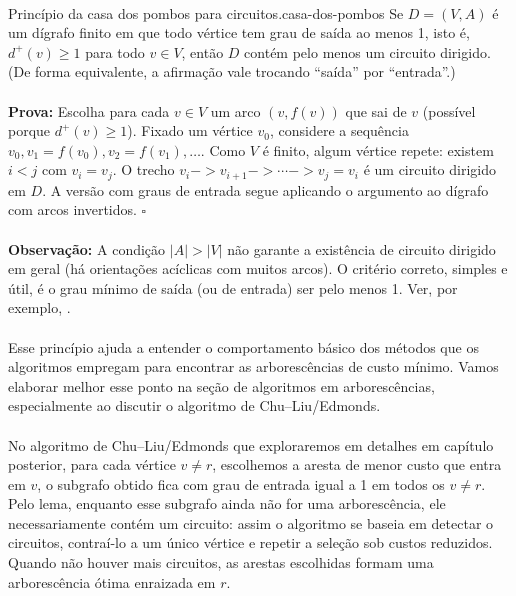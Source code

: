 \documentclass[12pt,a4paper]{article}
\def\emph#1{#1}%
\def\to{->}%
\begin{document}
\paragraph{}
\begin{lemabox}{Princípio da casa dos pombos para circuitos.}{casa-dos-pombos}
    Se \(D=(V,A)\) é um dígrafo finito em que todo vértice tem grau de saída ao menos 1, isto é, \(d^+(v)\ge 1\) para todo \(v\in V\), então \(D\) contém pelo menos um circuito dirigido. (De forma equivalente, a afirmação vale trocando ``saída'' por ``entrada''.)

    \paragraph{}
    \textbf{Prova:} Escolha para cada \(v\in V\) um arco \((v,f(v))\) que sai de \(v\) (possível porque \(d^+(v)\ge 1\)). Fixa\-do um vértice \(v_0\), considere a sequência \(v_0, v_1=f(v_0), v_2=f(v_1),\dots\). Como \(V\) é finito, algum vértice repete: existem \(i<j\) com \(v_i=v_j\). O trecho \(v_i\to v_{i+1}\to\cdots\to v_j=v_i\) é um circuito dirigido em \(D\). A versão com graus de entrada segue aplicando o argumento ao dígrafo com arcos invertidos. \hfill$\square$

    \paragraph{}
    \smallskip
    \textbf{Observação:} A condição \(|A|>|V|\) \emph{não} garante a existência de circuito dirigido em geral (há orientações acíclicas com muitos arcos). O critério correto, simples e útil, é o grau mínimo de saída (ou de entrada) ser pelo menos 1. Ver, por exemplo, \cite{schrijver2003comb}.

\end{lemabox}

\paragraph{}
Esse princípio ajuda a entender o comportamento básico dos métodos que os algoritmos empregam para encontrar as arborescências de custo mínimo. Vamos elaborar melhor esse ponto na seção de algoritmos em arborescências, especialmente ao discutir o algoritmo de Chu--Liu/Edmonds.

\paragraph{}
No algoritmo de Chu--Liu/Edmonds que exploraremos em detalhes em capítulo posterior, para cada vértice \(v\neq r\), escolhemos a aresta de menor custo que entra em \(v\), o subgrafo obtido fica com grau de entrada igual a 1 em todos os \(v\neq r\). Pelo lema, enquanto esse subgrafo ainda não for uma arborescência, ele necessariamente contém um circuito: assim o algoritmo se baseia em detectar o circuitos, contraí-lo a um único vértice e repetir a seleção sob custos reduzidos. Quando não houver mais circuitos, as arestas escolhidas formam uma arborescência ótima enraizada em \(r\).
\end{document}

